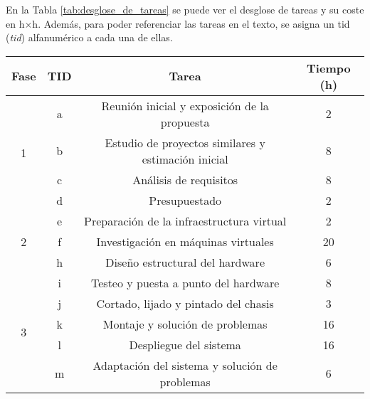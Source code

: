 En la Tabla \ref{tab:desglose_de_tareas} se puede ver el desglose de tareas y su coste en h$\times$h. Además, para poder referenciar las tareas en el texto, se asigna un \acrshort{tid} (\textit{\acrlong{tid}}) alfanumérico a cada una de ellas. 
\begin{table}[htpb]
  \centering
  \begin{tabular}{ |c|c|c|c| }
  \hline
  \textbf{Fase} & \textbf{TID} & \textbf{Tarea} & \textbf{Tiempo (h)} \\ 
  \hline
  \multirow{4}{*}{1}        & a     & {Reunión inicial y exposición de la propuesta}                            & 2 \\\cline{2-4}
                            & b     & {Estudio de proyectos similares y estimación inicial}                     & 8 \\\cline{2-4}
                            & c     & {Análisis de requisitos}                                                  & 8 \\\cline{2-4}
                            & d     & {Presupuestado}                                                           & 2 \\
  \hline
  \multirow{3}{*}{2}        & e     & {Preparación de la infraestructura virtual}                               & 2 \\\cline{2-4}
                            & f     & {Investigación en máquinas virtuales}                                     & 20 \\\cline{2-4}
                            & h     & {Diseño estructural del hardware}                                         & 6 \\
  \hline
  \multirow{5}{*}{3}        & i     & {Testeo y puesta a punto del hardware}                                     & 8 \\\cline{2-4}
                            & j     & {Cortado, lijado y pintado del chasis}                                    & 3 \\\cline{2-4}
                            & k     & {Montaje y solución de problemas}                                         & 16 \\\cline{2-4}
                            & l     & {Despliegue del sistema}                                                  & 16 \\\cline{2-4}
                            & m     & {Adaptación del sistema y solución de problemas}                          & 6 \\
  \hline

\end{tabular}
\end{table}
